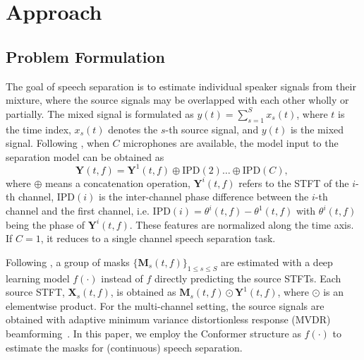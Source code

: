 \documentclass{article}
\begin{document}
	
	


	


	




	
	
	


	\section{Approach}
	\subsection{Problem Formulation}
	The goal of speech separation is to  estimate individual speaker signals from their mixture, where the source  signals may be overlapped with each other wholly or partially. The mixed signal is formulated as 
$y(t)=\sum_{s=1}^S x_s(t)$, 
	where $t$ is the time index, $x_s(t)$ denotes the $s$-th source signal, and $y(t)$ is the mixed signal. 
Following \cite{yoshioka2018multi}, 
	when $C$ microphones are available, the model input to the separation model can be obtained as 
	\begin{equation}
	\mathbf{Y}(t,f) = \mathbf{Y}^1(t,f) \oplus \text{IPD}(2) \ldots \oplus \text{IPD}(C), \
	\end{equation} where $\oplus$ means a concatenation operation, $\mathbf{Y}^i(t,f)$ refers to the STFT of the $i$-th channel, $\text{IPD}(i)$ is the inter-channel phase difference between the $i$-th channel and the first channel, i.e. $ \text{IPD}(i) = \theta^{i}(t,f) - \theta^1(t,f)$ with $\theta^{i}(t,f)$ being the phase of $\mathbf{Y}^i(t,f)$. 
	These features are normalized along the time axis. If $C=1$, it reduces to a single channel speech separation task. 
	
	
	
	Following \cite{wang2014training, erdogan2017deep}, a group of masks $\{\mathbf{M}_s(t,f)\}_{1 \leq s \leq S}$ are estimated with a deep learning model $f(\cdot)$ instead of $f$ directly predicting the source STFTs. 
Each source STFT, $\mathbf{X}_s(t,f)$, is obtained as $\mathbf{M}_s(t,f) \odot  \mathbf{Y}^1(t,f) $, where $\odot$ is an elementwise product. 
	For the multi-channel setting, 
	the source signals are obtained with adaptive minimum variance distortionless response (MVDR) beamforming~\cite{6516079}. 
	In this paper, we employ the Conformer  structure \cite{gulati2020conformer} as $f(\cdot)$ to estimate the masks for (continuous) speech separation. 
	
\end{document}
